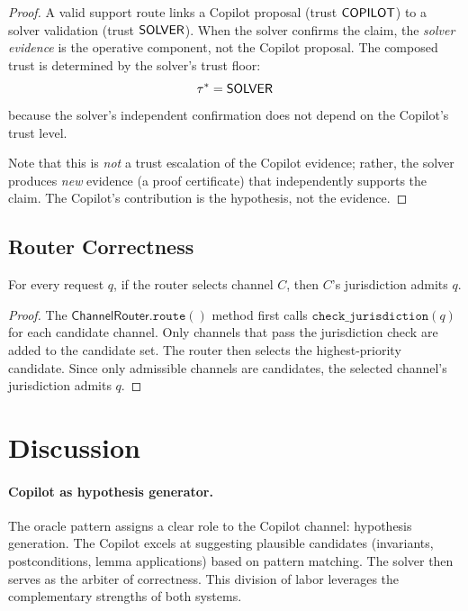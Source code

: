 \documentclass[11pt]{article}
\newcommand{\ChanRouter}{\mathsf{ChannelRouter}}
\begin{document}
\begin{proof}
A valid support route links a Copilot proposal (trust $\mathsf{COPILOT}$)
to a solver validation (trust $\mathsf{SOLVER}$).  When the solver
confirms the claim, the \emph{solver evidence} is the operative
component, not the Copilot proposal.  The composed trust is
determined by the solver's trust floor:
\[
  \tau^* = \mathsf{SOLVER}
\]
because the solver's independent confirmation does not depend on
the Copilot's trust level.

Note that this is \emph{not} a trust escalation of the Copilot
evidence; rather, the solver produces \emph{new} evidence (a proof
certificate) that independently supports the claim.  The Copilot's
contribution is the hypothesis, not the evidence.
\end{proof}

\subsection{Router Correctness}
\label{sec:formal:router}

\begin{theorem}
\label{thm:router}
For every request $q$, if the router selects channel $C$, then
$C$'s jurisdiction admits $q$.
\end{theorem}

\begin{proof}
The $\ChanRouter.\texttt{route}()$ method first calls
$\texttt{check\_jurisdiction}(q)$ for each candidate channel.
Only channels that pass the jurisdiction check are added to the
candidate set.  The router then selects the highest-priority
candidate.  Since only admissible channels are candidates, the
selected channel's jurisdiction admits $q$.
\end{proof}

\section{Discussion}
\label{sec:discussion}

\paragraph{Copilot as hypothesis generator.}
The oracle pattern assigns a clear role to the Copilot channel:
hypothesis generation.  The Copilot excels at suggesting plausible
candidates (invariants, postconditions, lemma applications) based
on pattern matching.  The solver then serves as the arbiter of
correctness.  This division of labor leverages the complementary
strengths of both systems.
\end{document}
